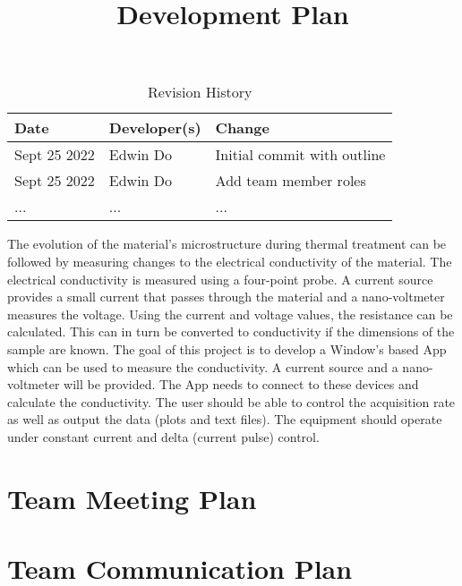 \documentclass{article}
\title{Development Plan\\\progname}
\author{\authname}
\date{}
\begin{document}
\begin{table}[hp]
\caption{Revision History} \label{TblRevisionHistory}
\begin{tabularx}{\textwidth}{llX}
\toprule
\textbf{Date} & \textbf{Developer(s)} & \textbf{Change}\\
\midrule
Sept 25 2022 & Edwin Do & Initial commit with outline\\
Sept 25 2022 & Edwin Do & Add team member roles\\
... & ... & ...\\
\bottomrule
\end{tabularx}
\end{table}

\newpage

\maketitle

\indent The evolution of the material’s microstructure during thermal treatment can be followed by measuring changes to the electrical conductivity of the material. The electrical conductivity is measured using a four-point probe. A current source provides a small current that passes through the material and a nano-voltmeter measures the voltage. Using the current and voltage values, the resistance can be calculated. This can in turn be converted to conductivity if the dimensions of the sample are known. The goal of this project is to develop a Window’s based App which can be used to measure the conductivity. A current source and a nano- voltmeter will be provided. The App needs to connect to these devices and calculate the conductivity. The user should be able to control the acquisition rate as well as output the data (plots and text files). The equipment should operate under constant current and delta (current pulse) control.

\section{Team Meeting Plan}

\section{Team Communication Plan}
\end{document}
